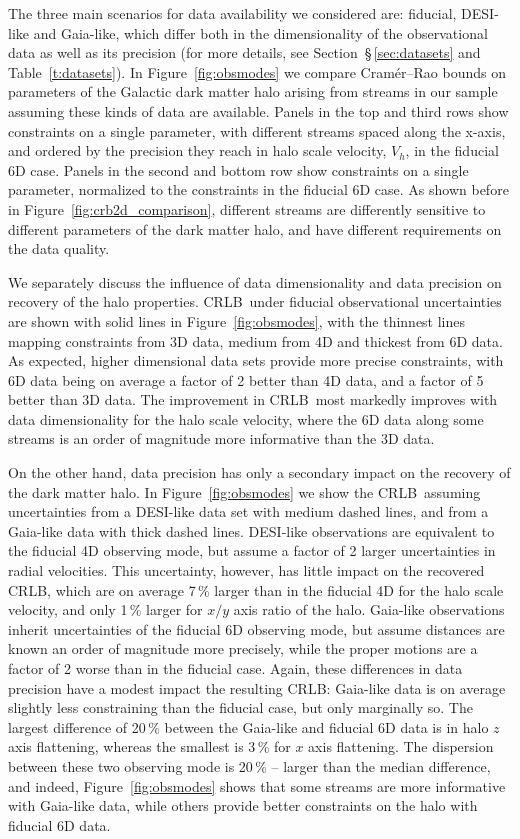 \documentclass[modern]{aastex61}
\newcommand{\acronym}[1]{{\small{#1}}}
\newcommand{\CRLB}{\acronym{CRLB}}
\begin{document}
The three main scenarios for data availability we considered are: fiducial, DESI-like and Gaia-like, which differ both in the dimensionality of the observational data as well as its precision (for more details, see Section~\S\,\ref{sec:datasets} and Table~\ref{t:datasets}).
In Figure~\ref{fig:obsmodes} we compare Cram\'er--Rao bounds on parameters of the Galactic dark matter halo arising from streams in our sample assuming these kinds of data are available.
Panels in the top and third rows show constraints on a single parameter, with different streams spaced along the x-axis, and ordered by the precision they reach in halo scale velocity, $V_h$, in the fiducial 6D case.
Panels in the second and bottom row show constraints on a single parameter, normalized to the constraints in the fiducial 6D case.
As shown before in Figure~\ref{fig:crb2d_comparison}, different streams are differently sensitive to different parameters of the dark matter halo, and have different requirements on the data quality.

We separately discuss the influence of data dimensionality and data precision on recovery of the halo properties.
\CRLB\ under fiducial observational uncertainties are shown with solid lines in Figure~\ref{fig:obsmodes}, with the thinnest lines mapping constraints from 3D data, medium from 4D and thickest from 6D data.
As expected, higher dimensional data sets provide more precise constraints, with 6D data being on average a factor of 2 better than 4D data, and a factor of 5 better than 3D data.
The improvement in \CRLB\ most markedly improves with data dimensionality for the halo scale velocity, where the 6D data along some streams is an order of magnitude more informative than the 3D data.

On the other hand, data precision has only a secondary impact on the recovery of the dark matter halo.
In Figure~\ref{fig:obsmodes} we show the \CRLB\ assuming uncertainties from a DESI-like data set with medium dashed lines, and from a Gaia-like data with thick dashed lines.
DESI-like observations are equivalent to the fiducial 4D observing mode, but assume a factor of 2 larger uncertainties in radial velocities.
This uncertainty, however, has little impact on the recovered \CRLB, which are on average 7\,\% larger than in the fiducial 4D for the halo scale velocity, and only 1\,\% larger for $x/y$ axis ratio of the halo.
Gaia-like observations inherit uncertainties of the fiducial 6D observing mode, but assume distances are known an order of magnitude more precisely, while the proper motions are a factor of 2 worse than in the fiducial case.
Again, these differences in data precision have a modest impact the resulting \CRLB: Gaia-like data is on average slightly less constraining than the fiducial case, but only marginally so.
The largest difference of 20\,\% between the Gaia-like and fiducial 6D data is in halo $z$ axis flattening, whereas the smallest is 3\,\% for $x$ axis flattening.
The dispersion between these two observing mode is 20\,\% -- larger than the median difference, and indeed, Figure~\ref{fig:obsmodes} shows that some streams are more informative with Gaia-like data, while others provide better constraints on the halo with fiducial 6D data.
\end{document}
